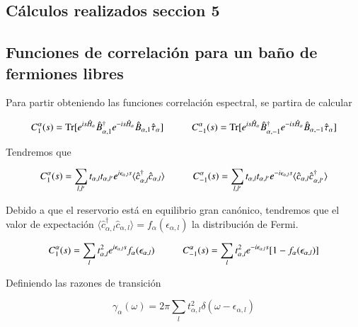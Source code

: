 \begin{appendixs}
\newpage

\section{Cálculos realizados seccion 5}
\subsection{Funciones de correlación para un baño de fermiones libres}
Para partir obteniendo las funciones correlación espectral, se partira de calcular

\begin{equation*}
    C_{1}^{\alpha}(s) = \text{Tr}[e^{is\hat{H}_{\alpha}}\hat{B}^{\dagger}_{\alpha,1}e^{-is\hat{H}_{\alpha}}\hat{B}_{\alpha,1}\hat{\tau}_{\alpha}  ]  \hspace{10mm} C_{-1}^{\alpha}(s) = \text{Tr}[e^{is\hat{H}_{\alpha}}\hat{B}^{\dagger}_{\alpha,-1}e^{-is\hat{H}_{\alpha}}\hat{B}_{\alpha,-1}\hat{\tau}_{\alpha}  ] 
\end{equation*}

Tendremos que

\begin{equation*}
    C_{1}^{\alpha}(s) = \sum_{l,l'}t_{\alpha,l}t_{\alpha,l'}e^{i\epsilon_{\alpha,l}s} \langle \hat{c}^{\dagger}_{\alpha,l}\hat{c}_{\alpha,l} \rangle \hspace{10mm} C
    ^{\alpha}_{-1}(s) = \sum_{l,l'}t_{\alpha,l}t_{\alpha,l'}e^{-i\epsilon_{\alpha,l}s} \langle \hat{c}_{\alpha,l}\hat{c}^{\dagger}_{\alpha,l'} \rangle
\end{equation*}

Debido a que el reservorio está en equilibrio gran canónico, tendremos que el valor de expectación $\langle \hat{c}^{\dagger}_{\alpha,l}\hat{c}_{\alpha,l}\rangle = f_{\alpha}(\epsilon_{\alpha,l})$ la distribución de Fermi. 

\begin{equation*}
    C_{1}^{\alpha}(s) = \sum_{l}t^{2}_{\alpha,l}e^{i\epsilon_{\alpha,l}s} f_{\alpha}(\epsilon_{\alpha,l}) \hspace{10mm} C
    ^{\alpha}_{-1}(s) = \sum_{l}t^{2}_{\alpha,l}e^{-i\epsilon_{\alpha,l}s} [1-f_{\alpha}(\epsilon_{\alpha,l})]
\end{equation*}

Definiendo las razones de transición

\begin{equation*}
    \gamma_{\alpha}(\omega) = 2\pi \sum_{l}t^{2}_{\alpha,l}\delta(\omega-\epsilon_{\alpha,l})
\end{equation*}


\end{appendixs}
